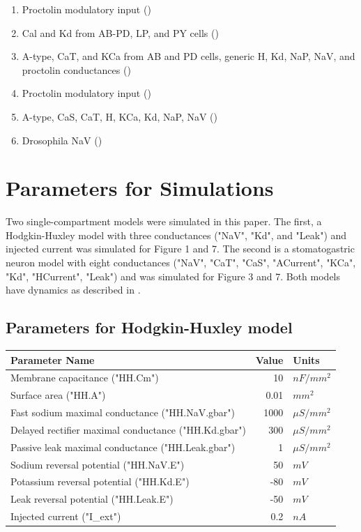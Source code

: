 \documentclass[utf8]{frontiers_suppmat} %
\begin{document}
\begin{enumerate}
		\item Proctolin modulatory input (\cite{sharpDynamicClampComputergenerated1993})
		\item Cal and Kd from AB-PD, LP, and PY cells (\cite{soto-trevinoActivitydependentModificationInhibitory2001})
		\item A-type, CaT, and KCa from AB and PD cells, generic H, Kd, NaP, NaV, and proctolin conductances (\cite{soto-trevinoComputationalModelElectrically2005})
		\item Proctolin modulatory input (\cite{swensenModulatorsConvergentCellular2001})
		\item A-type, CaS, CaT, H, KCa, Kd, NaP, NaV (\cite{turrigianoSelectiveRegulationCurrent1995})
		\item Drosophila NaV (\cite{wicherNonsynapticIonChannels2001})
	\end{enumerate}

\section{Parameters for Simulations}

	Two single-compartment models were simulated in this paper. The first, a Hodgkin-Huxley model with three conductances ("NaV", "Kd", and "Leak") and injected current was simulated for Figure 1 and 7. The second is a stomatogastric neuron model with eight conductances ("NaV", "CaT", "CaS", "ACurrent", "KCa", "Kd", "HCurrent", "Leak") and was simulated for Figure 3 and 7. Both models have dynamics as described in \cite{liuModelNeuronActivityDependent1998}.
	
	\subsection{Parameters for Hodgkin-Huxley model} 
	
		\begin{center}
			\begin{tabular}{|l|r|l|}
				\hline 
				\textbf{Parameter Name} & \textbf{Value} & \textbf{Units} \\ 
				\hline 
				Membrane capacitance ("HH.Cm") & 10 & ${nF}/{mm^2}$ \\ 
				\hline 
				Surface area ("HH.A") & 0.01 & $mm^2$ \\ 
				\hline 
				Fast sodium maximal conductance ("HH.NaV.gbar") & 1000 & $\mu S/mm^2$ \\ 
				\hline 
				Delayed rectifier maximal conductance ("HH.Kd.gbar") & 300 & $\mu S/mm^2$ \\ 
				\hline 
				Passive leak maximal conductance ("HH.Leak.gbar") & 1 & $\mu S/mm^2$ \\ 
				\hline 
				Sodium reversal potential ("HH.NaV.E") & 50 & $mV$ \\ 
				\hline 
				Potassium reversal potential ("HH.Kd.E") & -80 & $mV$ \\ 
				\hline
				Leak reversal potential ("HH.Leak.E") & -50 & $mV$ \\
				\hline
				Injected current ("I_ext") & 0.2 & $nA$ \\
				\hline 
			\end{tabular} 
		\end{center}
	
\end{document}

